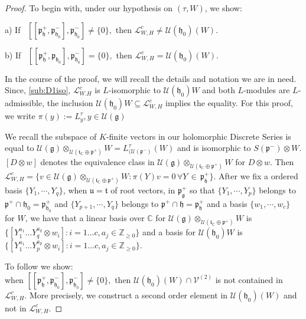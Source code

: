 \documentclass[12pt]{amsart}
\theoremstyle{definition}
\theoremstyle{remark}
\newcommand{\g}{\mathfrak{g}}
\newcommand{\h}{\mathfrak{h}}
\newcommand{\p}{\mathfrak p}
\renewcommand{\t}{{\mathfrak t}}
\renewcommand{\u}{{\mathfrak u}}
\newcommand{\C}{{\mathbb C}}
\newcommand{\Z}{{\mathbb Z}}
\numberwithin{equation}{section}
\begin{document}
\begin{proof}To begin with, under our hypothesis on $(\tau, W)$,  we show:

a)  If \, $[[\p_\h^+,
\mathfrak p_{\mathfrak h_0}^-], \p_{\h_0}^-]\not= \{0\},$ then
$\mathcal L_{W,H}^c     \not= \mathcal U(\mathfrak h_0) (W).$

b) If \, $[[\p_\h^+, \p_{\h_0}], \p_{\h_0}^-]=\{0\},$ then
$\mathcal L_{W,H}^c =\mathcal U(\mathfrak h_0) (W).$

In the course of the proof,  we will recall the details and notation
we are in need.
Since,  \ref{sub:D1iso}, \cite{OV2}\cite{OV3} $\mathcal L_{W.H}^c $ is $L $-isomorphic to $\mathcal U(\h_0)W $
    and both $L$-modules are $L$-admissible, the inclusion   $ \mathcal U(\h_0)W \subseteq  \mathcal L_{W,H}^c  $  implies the equality.  For this proof, we write
$\pi(y):=L_y^\tau, y\in \mathcal U(\g)$



We recall the subspace of $K$-finite vectors in our holomorphic Discrete Series  is equal to $\mathcal U(\g) \otimes_{\mathcal U(\t_\C \oplus \p^+)}   W =L_{(\mathcal U(\p^-)}^\tau(W)$
and is isomorphic to  $S(\p^-)\otimes W$.   $[D\otimes w]$ denotes the equivalence class in
$\mathcal U(\g) \otimes_{\mathcal U(\t_\C \oplus \p^+)}   W $ for $D\otimes w$.  Then
$\mathcal L_{W,H}^c= \{ v \in  \mathcal U(\g) \otimes_{\mathcal U(\t_\C \oplus
\p^+)} W : \pi(Y)v=0 \,\forall Y \, \in \, \p_\h^+ \}$. After we fix a ordered
basis $\{Y_1, \cdots, Y_q\}$, when $\u=\t$ of root vectors, in $\p_\g^+$
so that $\{Y_1, \cdots, Y_p\}$ belongs  to $\p^+ \cap \h_0 =\p_{\h_0}^+$ and
  $\{Y_{p+1}, \cdots, Y_q\}$ belongs to $\p^+ \cap \h =\p_{\h}^+$  and a basis $\{w_1,\cdots,w_c \}$
for $W$, we have that a linear basis over $\C$ for
$\mathcal U(\g) \otimes_{\mathcal U(\t_\C \oplus \p^+)} W $  is
    $\{ [Y_1^{a_1} \dots Y_q^{a_q} \otimes w_i] : i=1\dots c, a_j \in \Z_{\geq 0} \}  $
and a basis for $\mathcal U(\h_0)W $ is
    $\{[ Y_1^{a_1} \dots Y_p^{a_p} \otimes w_i] : i=1\dots c, a_j \in \Z_{\geq 0} \}  $.

To follow we show: \\
when     $[[\p_\h^+,
\mathfrak p_{\mathfrak h_0}^-], \p_{\h_0}^-]\not= \{0\},$ then
$ \mathcal U(\mathfrak h_0) (W) \cap \mathcal V^{(2)}$
is not contained in $\mathcal L_{W,H}^c $. More precisely, we construct a
second order element in $ \mathcal U(\mathfrak h_0) (W)$
and not in $\mathcal L_{W,H}^c $.


\end{proof}
\end{document}
